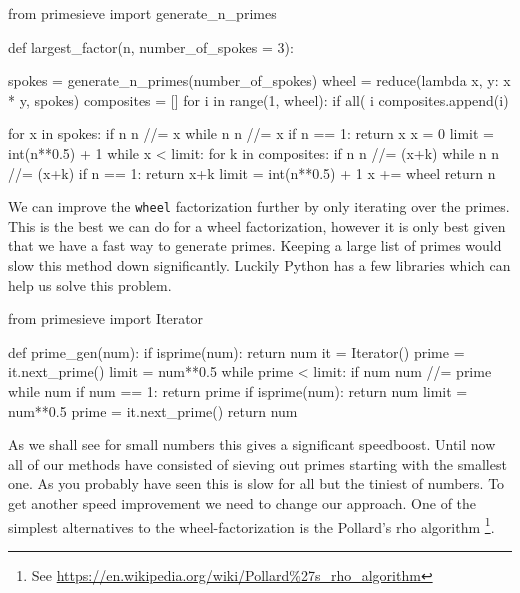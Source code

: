 \begin{pythoncode}
	from primesieve import generate_n_primes

	def largest_factor(n, number_of_spokes = 3):
	
	    spokes = generate_n_primes(number_of_spokes)
	    wheel = reduce(lambda x, y: x * y, spokes)
	    composites = []
	    for i in range(1, wheel):
	        if all( i %
	            composites.append(i)
	
	    for x in spokes:
	        if n %
	            n //= x
	            while n %
	                n //= x
	            if n == 1: 
	                return x
	    x = 0
	    limit = int(n**0.5) + 1
	    while x < limit:
	        for k in composites:
	            if n %
	                n //= (x+k)
	                while n %
	                    n //= (x+k)
	                if n == 1: return x+k
	                limit = int(n**0.5) + 1
	        x += wheel
	    return n
\end{pythoncode}
%
We can improve the \verb|wheel| factorization further by only iterating over the primes. This is the best we can do for a wheel factorization, however
it is only best given that we have a fast way to generate primes. Keeping a large list of primes would slow this method down significantly.
Luckily Python has a few libraries which can help us solve this problem.
%
\begin{pythoncode}
	from primesieve import Iterator
	
	def prime_gen(num):
	    if isprime(num): return num
	    it = Iterator()
	    prime = it.next_prime()
	    limit = num**0.5
	    while prime < limit:
	        if num %
	            num //= prime
	            while num %
	            if num == 1: return prime
	            if isprime(num): return num
	            limit = num**0.5
	        prime = it.next_prime()
	    return num
\end{pythoncode}
%
As we shall see for small numbers this gives a significant speedboost. Until now all of our methods have consisted of sieving out primes
starting with the smallest one. As you probably have seen this is slow for all but the tiniest of numbers. To get another speed improvement
we need to change our approach. One of the simplest alternatives to the wheel-factorization is the Pollard's rho algorithm
\footnote{See \url{https://en.wikipedia.org/wiki/Pollard\%27s_rho_algorithm}}.
%
